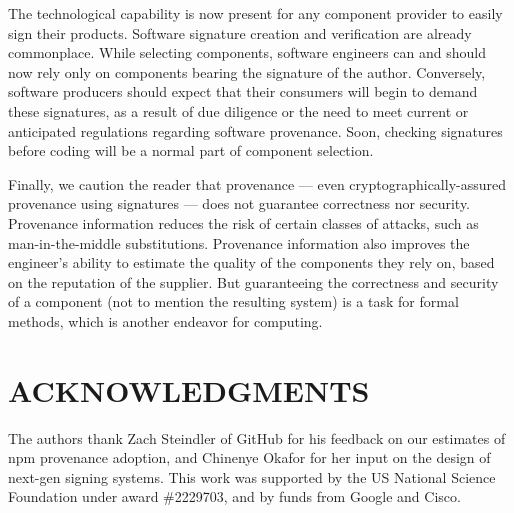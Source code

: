 \documentclass{IEEEcsmagTechrxiv}
\begin{document}
The technological capability is now present for any component provider to easily sign their products.
Software signature creation and verification are already commonplace.
While selecting components, software engineers can and should now rely only on components bearing the signature of the author.
Conversely, software producers should expect that their consumers will begin to demand these signatures, as a result of due diligence or the need to meet current or anticipated regulations regarding software provenance.
Soon, checking signatures before coding will be a normal part of component selection.

Finally, we caution the reader that provenance --- even cryptographically-assured provenance using signatures --- does not guarantee correctness nor security.
Provenance information reduces the risk of certain classes of attacks, such as man-in-the-middle substitutions.
Provenance information also improves the engineer's ability to estimate the quality of the components they rely on, \eg based on the reputation of the supplier.
But guaranteeing the correctness and security of a component (not to mention the resulting system) is a task for formal methods, which is another endeavor for computing.




\vspace*{-8pt}
\section{ACKNOWLEDGMENTS}
The authors thank
  Zach Steindler of GitHub for his feedback on our estimates of npm provenance adoption,
  and
  Chinenye Okafor for her input on the design of next-gen signing systems.
This work was supported by the US National Science Foundation under award \#2229703, and by funds from Google and Cisco.
\end{document}
